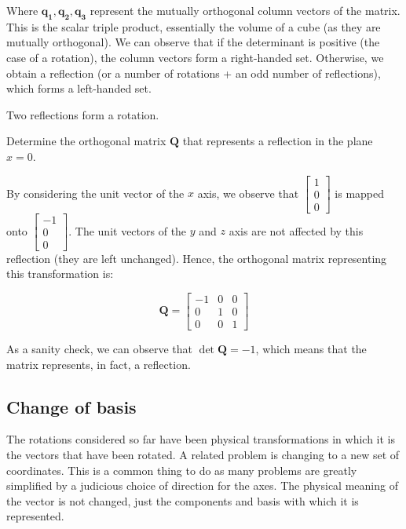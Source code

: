 \documentclass[12pt]{article}
\begin{document}
Where $\mathbf{q_1, q_2, q_3}$ represent the mutually orthogonal column vectors of the matrix. This is the scalar triple product, essentially the volume of a cube (as they are mutually orthogonal). We can observe that if the determinant is positive (the case of a rotation), the column vectors form a right-handed set. Otherwise, we obtain a reflection (or a number of rotations + an odd number of reflections), which forms a left-handed set.

\begin{proposition}
    Two reflections form a rotation.
\end{proposition}

\begin{example}
    Determine the orthogonal matrix $\mathbf{Q}$ that represents a reflection in the plane $x = 0$.

    By considering the unit vector of the $x$ axis, we observe that $\begin{bmatrix}
        1 \\ 0 \\ 0
    \end{bmatrix}$ is mapped onto $\begin{bmatrix}
        -1 \\ 0 \\ 0
    \end{bmatrix}$. The unit vectors of the $y$ and $z$ axis are not affected by this reflection (they are left unchanged). Hence, the orthogonal matrix representing this transformation is:

    \[ \mathbf{Q} = \begin{bmatrix}
        -1 & 0 & 0 \\
        0 & 1 & 0 \\
        0 & 0 & 1
    \end{bmatrix} \]
\end{example}

As a sanity check, we can observe that $\det{\mathbf{Q}} = -1$, which means that the matrix represents, in fact, a reflection.

\newpage

\subsection{Change of basis}

The rotations considered so far have been physical transformations in which it is the vectors
that have been rotated. A related problem is changing to a new set of coordinates. This is a
common thing to do as many problems are greatly simplified by a judicious choice of direction
for the axes. The physical meaning of the vector is not changed, just the components and
basis with which it is represented.
\end{document}

